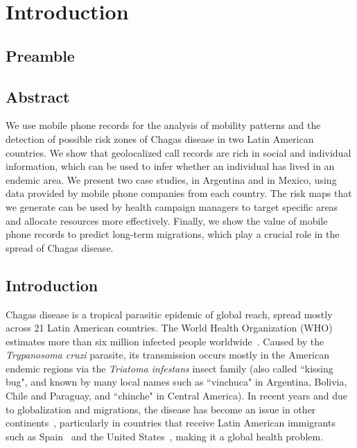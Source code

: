 
\chapter{Introduction}
\label{cha:intro}


\section{Preamble}

\section{Abstract}\label{section-abstract}


We use mobile phone records for the analysis of mobility patterns and the detection of possible risk zones of Chagas disease in two Latin American countries. We show that geolocalized call records are rich in social and individual information, which can be used to infer whether an individual has lived in an endemic area. We present two case studies, in Argentina and in Mexico, using data provided by mobile phone companies from each country. The risk maps that we generate can be used by health campaign managers to target specific areas and allocate resources more effectively. Finally, we show the value of mobile phone records to predict long-term migrations, which play a crucial role in the spread of Chagas disease.


\section{Introduction}

Chagas disease is a tropical parasitic epidemic of global reach, spread mostly across 21 Latin American countries. The World Health Organization (WHO) estimates more than six million infected people worldwide~\cite{who2016}.  Caused by the \textit{Trypanosoma cruzi} parasite, its transmission occurs mostly in the American endemic regions via the \textit{Triatoma infestans} insect family (also called ``kissing bug", and known by many local names such as ``vinchuca" in Argentina, Bolivia, Chile and Paraguay, and ``chinche" in Central America). In recent years and due to globalization and migrations, the disease has become an %
issue in other continents~\cite{schmunis2010chagas}, 
particularly in countries that receive Latin American immigrants such as Spain~\cite{navarro2012chagas} and the United States~\cite{hotez2013unfolding}, 
making it a global health problem.


